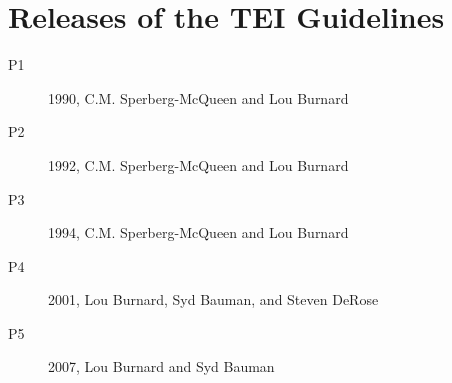 
\section[{Releases of the TEI Guidelines}]{Releases of the TEI Guidelines}\label{TitlePageVerso}\begin{description}

\item[{P1}]1990, C.M. Sperberg-McQueen and Lou Burnard
\item[{P2}]1992, C.M. Sperberg-McQueen and Lou Burnard
\item[{P3}]1994, C.M. Sperberg-McQueen and Lou Burnard
\item[{P4}]2001, Lou Burnard, Syd Bauman, and Steven DeRose
\item[{P5}]2007, Lou Burnard and Syd Bauman
\end{description} 